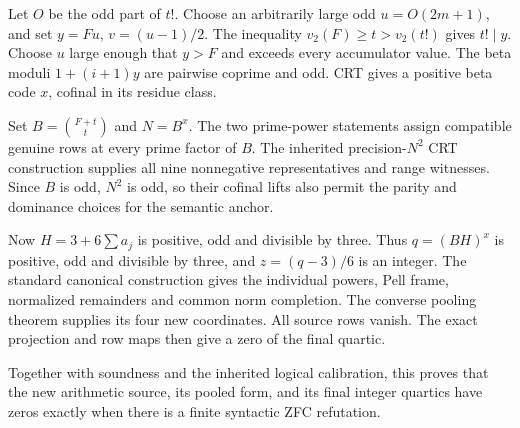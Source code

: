 Let $O$ be the odd part of $t!$. Choose an arbitrarily large odd
$u=O(2m+1)$, and set $y=Fu$, $v=(u-1)/2$. The inequality
$v_2(F)\ge t>v_2(t!)$ gives $t!\mid y$. Choose $u$ large enough
that $y>F$ and exceeds every accumulator value. The beta moduli
$1+(i+1)y$ are pairwise coprime and odd. CRT gives a positive beta
code $x$, cofinal in its residue class.

Set $B=\binom{F+t}{t}$ and $N=B^x$. The two prime-power statements
assign compatible genuine rows at every prime factor of $B$.
The inherited precision-$N^2$ CRT construction supplies all nine
nonnegative representatives and range witnesses. Since $B$ is odd,
$N^2$ is odd, so their cofinal lifts also permit the parity and
dominance choices for the semantic anchor.

Now $H=3+6\sum a_j$ is positive, odd and divisible by three.
Thus $q=(BH)^x$ is positive, odd and divisible by three, and
$z=(q-3)/6$ is an integer. The standard canonical construction gives
the individual powers, Pell frame, normalized remainders and common
norm completion. The converse pooling theorem supplies its four new
coordinates. All source rows vanish. The exact projection and row
maps then give a zero of the final quartic.

Together with soundness and the inherited logical calibration, this
proves that the new arithmetic source, its pooled form, and its final
integer quartics have zeros exactly when there is a finite syntactic
ZFC refutation.
